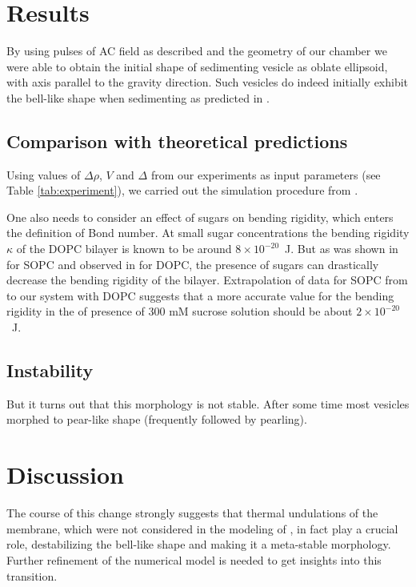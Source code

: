 \documentclass[10pt,a4paper]{article}
\begin{document}
\section{Results}\label{results}
By using pulses of AC field as described and the geometry of our chamber we were able to obtain the initial shape of sedimenting vesicle as oblate ellipsoid, with axis parallel to the gravity direction.
Such vesicles do indeed initially exhibit the bell-like shape when sedimenting as predicted in \cite{Boedec2012}.



\subsection{Comparison with theoretical predictions}
Using values of $\Delta\rho$, $V$ and $\Delta$ from our experiments as input parameters (see Table \ref{tab:experiment}), we carried out the simulation procedure from \cite{Boedec2012}.

One also needs to consider an effect of sugars on bending rigidity, which enters the definition of Bond number.
At small sugar concentrations the bending rigidity $\kappa$ of the DOPC bilayer is known to be around $8\times10^{-20}$~J.
But as was shown in \cite{Vitkova2006} for SOPC and observed in \cite{Shchelokovskyy2011} for DOPC, the presence of sugars can drastically decrease the bending rigidity of the bilayer. 
Extrapolation of data for SOPC from \cite{Vitkova2006} to our system with DOPC suggests that a more accurate value for the bending rigidity in the of presence of 300 mM sucrose solution should be about $2\times10^{-20}$~J.

\subsection{Instability}
But it turns out that this morphology is not stable. After some time most vesicles morphed to pear-like shape (frequently followed by pearling).

\section{Discussion}\label{discussion}
The course of this change strongly suggests that thermal undulations of the membrane, which were not considered in the modeling of \cite{Boedec2012}, in fact play a crucial role, destabilizing the bell-like shape and making it a meta-stable morphology. Further refinement of the numerical model is needed to get insights into this transition.


\end{document}
